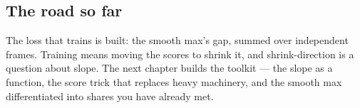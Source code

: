 \cleardoublepage
\begin{narrative}
\section*{The road so far}


\noindent The loss that trains is built: the smooth max's gap, summed over independent frames. Training means moving the scores to shrink it, and shrink-direction is a question about slope. The next chapter builds the toolkit — the slope as a function, the score trick that replaces heavy machinery, and the smooth max differentiated into shares you have already met.
\end{narrative}
